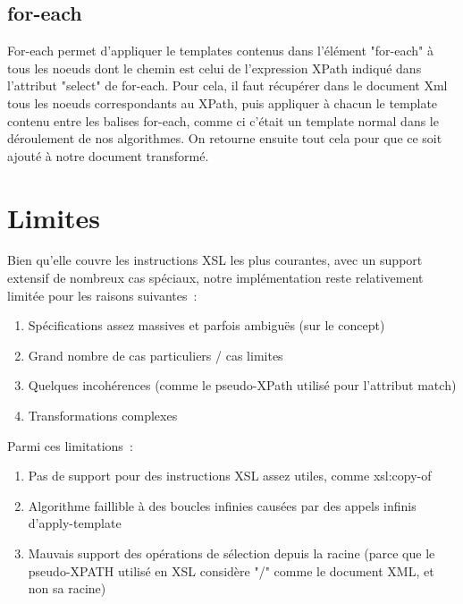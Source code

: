     \subsection{for-each}
        For-each permet d'appliquer le templates contenus dans l'élément "for-each" à tous les noeuds dont le chemin est celui de l'expression XPath indiqué dans l'attribut "select" de for-each. Pour cela, il faut récupérer dans le document Xml tous les noeuds correspondants au XPath, puis appliquer à chacun le template contenu entre les balises for-each, comme ci c'était un template normal dans le déroulement de nos algorithmes. On retourne ensuite tout cela pour que ce soit ajouté à notre document transformé.

\section{Limites}

Bien qu'elle couvre les instructions XSL les plus courantes, avec un support extensif de nombreux cas spéciaux,
notre implémentation reste relativement limitée pour les raisons suivantes~:

\begin{enumerate}
    \item Spécifications assez massives et parfois ambiguës (sur le concept)
    \item Grand nombre de cas particuliers / cas limites
    \item Quelques incohérences (comme le pseudo-XPath utilisé pour l'attribut match)
    \item Transformations complexes
\end{enumerate}

Parmi ces limitations~:

\begin{enumerate}
    \item Pas de support pour des instructions XSL assez utiles, comme xsl:copy-of
    \item Algorithme faillible à des boucles infinies causées par des appels infinis d'apply-template
    \item Mauvais support des opérations de sélection depuis la racine (parce que le pseudo-XPATH utilisé en XSL considère "/" comme le document XML, et non sa racine)
\end{enumerate}
